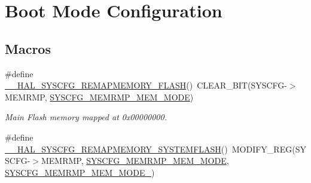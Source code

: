 \hypertarget{group___s_y_s_c_f_g___boot_mode_config}{\section{Boot Mode Configuration}
\label{group___s_y_s_c_f_g___boot_mode_config}
}
\subsection*{Macros}
\begin{DoxyCompactItemize}
\item 
\hypertarget{group___s_y_s_c_f_g___boot_mode_config_ga9500619e1ec21659bd32b1dfecd5afc1}{\#define \hyperlink{group___s_y_s_c_f_g___boot_mode_config_ga9500619e1ec21659bd32b1dfecd5afc1}{\-\_\-\-\_\-\-H\-A\-L\-\_\-\-S\-Y\-S\-C\-F\-G\-\_\-\-R\-E\-M\-A\-P\-M\-E\-M\-O\-R\-Y\-\_\-\-F\-L\-A\-S\-H}()~C\-L\-E\-A\-R\-\_\-\-B\-I\-T(S\-Y\-S\-C\-F\-G-\/$>$M\-E\-M\-R\-M\-P, \hyperlink{group___peripheral___registers___bits___definition_ga3c05039ec67573c00da29f58b914f258}{S\-Y\-S\-C\-F\-G\-\_\-\-M\-E\-M\-R\-M\-P\-\_\-\-M\-E\-M\-\_\-\-M\-O\-D\-E})}\label{group___s_y_s_c_f_g___boot_mode_config_ga9500619e1ec21659bd32b1dfecd5afc1}

\begin{DoxyCompactList}\small\item\em Main Flash memory mapped at 0x00000000. \end{DoxyCompactList}\item 
\hypertarget{group___s_y_s_c_f_g___boot_mode_config_ga59782d94690fd538b25def536c81c3ed}{\#define \hyperlink{group___s_y_s_c_f_g___boot_mode_config_ga59782d94690fd538b25def536c81c3ed}{\-\_\-\-\_\-\-H\-A\-L\-\_\-\-S\-Y\-S\-C\-F\-G\-\_\-\-R\-E\-M\-A\-P\-M\-E\-M\-O\-R\-Y\-\_\-\-S\-Y\-S\-T\-E\-M\-F\-L\-A\-S\-H}()~M\-O\-D\-I\-F\-Y\-\_\-\-R\-E\-G(S\-Y\-S\-C\-F\-G-\/$>$M\-E\-M\-R\-M\-P, \hyperlink{group___peripheral___registers___bits___definition_ga3c05039ec67573c00da29f58b914f258}{S\-Y\-S\-C\-F\-G\-\_\-\-M\-E\-M\-R\-M\-P\-\_\-\-M\-E\-M\-\_\-\-M\-O\-D\-E}, \hyperlink{group___peripheral___registers___bits___definition_ga30d5f406535f94faea2e7f924d50201b}{S\-Y\-S\-C\-F\-G\-\_\-\-M\-E\-M\-R\-M\-P\-\_\-\-M\-E\-M\-\_\-\-M\-O\-D\-E\-\_})}\label{group___s_y_s_c_f_g___boot_mode_config_ga59782d94690fd538b25def536c81c3ed}


\end{DoxyCompactItemize}
